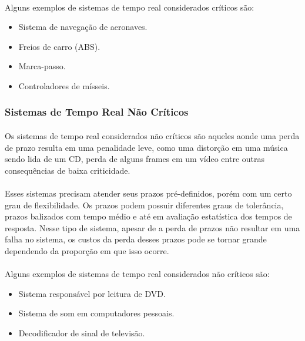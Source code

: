 \paragraph{}
Alguns exemplos de sistemas de tempo real considerados críticos são:
\begin{itemize}
\item Sistema de navegação de aeronaves.
\item Freios de carro (ABS).
\item Marca-passo.
\item Controladores de mísseis.
\end{itemize}

\subsubsection{Sistemas de Tempo Real Não Críticos}
\paragraph{}
Os sistemas de tempo real considerados não críticos são aqueles aonde uma perda de prazo
resulta em uma penalidade leve, como uma distorção em uma música sendo lida de um CD, perda
de alguns frames em um vídeo entre outras consequências de baixa criticidade.
\paragraph{}
Esses sistemas precisam atender seus prazos pré-definidos, porém com um certo grau de flexibilidade.
Os prazos podem possuir diferentes graus de tolerância, prazos balizados com tempo médio e até em avaliação
estatística dos tempos de resposta. Nesse tipo de sistema, apesar de a perda de prazos não resultar em uma
falha no sistema, os custos da perda desses prazos pode se tornar grande dependendo da proporção em que isso
ocorre.~\cite{Li:2003:RCE:829584}

\paragraph{}
Alguns exemplos de sistemas de tempo real considerados não críticos são:
\begin{itemize}
\item Sistema responsável por leitura de DVD.
\item Sistema de som em computadores pessoais.
\item Decodificador de sinal de televisão.
\end{itemize}

